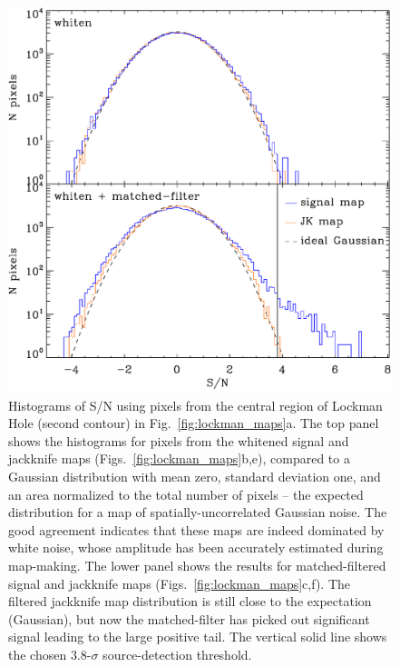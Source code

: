 \documentclass[useAMS,usenatbib,nofootinbib]{mn2e}
\begin{document}
\begin{figure}
\centering
\includegraphics[width=\linewidth]{lockman_hist.pdf}
\caption{Histograms of S/N using pixels from the central region of
  Lockman Hole (second contour) in Fig.~\ref{fig:lockman_maps}a. The
  top panel shows the histograms for pixels from the whitened signal
  and jackknife maps (Figs.~\ref{fig:lockman_maps}b,e), compared to a
  Gaussian distribution with mean zero, standard deviation one, and an
  area normalized to the total number of pixels -- the expected
  distribution for a map of spatially-uncorrelated Gaussian noise. The
  good agreement indicates that these maps are indeed dominated by
  white noise, whose amplitude has been accurately estimated during
  map-making. The lower panel shows the results for matched-filtered
  signal and jackknife maps (Figs.~\ref{fig:lockman_maps}c,f). The
  filtered jackknife map distribution is still close to the
  expectation (Gaussian), but now the matched-filter has picked out
  significant signal leading to the large positive tail. The vertical
  solid line shows the chosen 3.8-$\sigma$ source-detection
  threshold.}
\label{fig:lockman_hist}
\end{figure}
\end{document}
